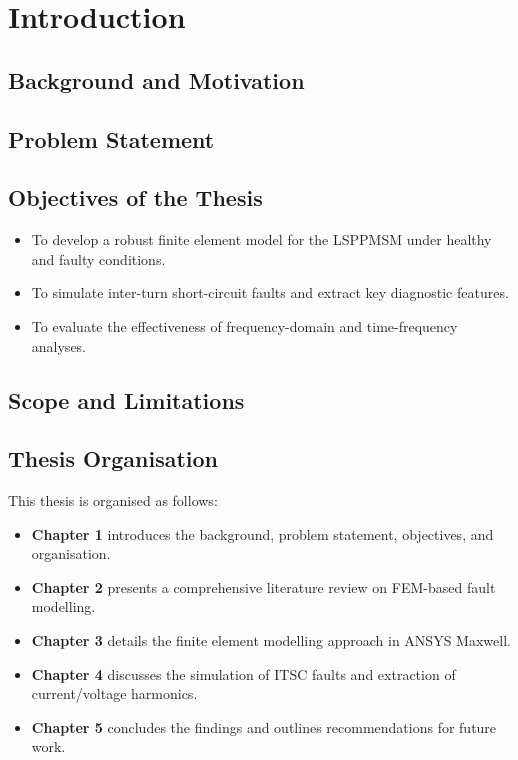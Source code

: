 \chapter{Introduction}

\section{Background and Motivation}
\lipsum[1-2]

\section{Problem Statement}
\lipsum[3]

\section{Objectives of the Thesis}
\begin{itemize}
    \item To develop a robust finite element model for the LSPPMSM under healthy and faulty conditions.
    \item To simulate inter-turn short-circuit faults and extract key diagnostic features.
    \item To evaluate the effectiveness of frequency-domain and time-frequency analyses.
\end{itemize}
\lipsum[4]

\section{Scope and Limitations}
\lipsum[5]

\section{Thesis Organisation}
This thesis is organised as follows:
\begin{itemize}
    \item \textbf{Chapter 1} introduces the background, problem statement, objectives, and organisation.
    \item \textbf{Chapter 2} presents a comprehensive literature review on FEM-based fault modelling.
    \item \textbf{Chapter 3} details the finite element modelling approach in ANSYS Maxwell.
    \item \textbf{Chapter 4} discusses the simulation of ITSC faults and extraction of current/voltage harmonics.
    \item \textbf{Chapter 5} concludes the findings and outlines recommendations for future work.
\end{itemize}
\lipsum[6]
